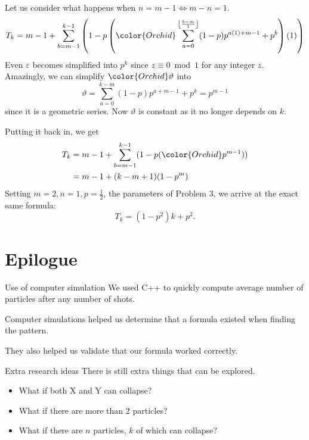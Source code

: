 \documentclass[xcolor={usenames,dvipsnames}]{beamer}
\DeclarePairedDelimiter\floor{\lfloor}{\rfloor}
\begin{document}
\begin{frame}
  Let us consider what happens when $n = m-1 \iff m-n = 1$.
  \begin{equation*}
    T_k = m-1+\sum _{b=m-1}^{k-1} \left(1-p \left({\color{Orchid}\sum _{a=0}^{\floor*{\frac{b-m}{1}} } (1-p) p^{a (1)+m-1}+p^{b}}\right) (1)\right)
  \end{equation*}
  Even $\varepsilon$ becomes simplified into $p^{k}$ since $z \equiv 0 \bmod 1$ for any integer  $z$. Amazingly, we can simplify $\color{Orchid} \vartheta$ into  \[
    \vartheta = \sum _{a=0}^{k-m } (1-p) p^{a+m-1}+p^{k} = p^{m-1}
  \] since it is a geometric series. Now $\vartheta$ is constant as it no longer depends on  $k$.
\end{frame}
\begin{frame}
  Putting it back in, we get 
    \begin{align*}
      T_k &= m-1 + \sum_{b=m-1}^{k-1} (1-p({\color{Orchid} p^{m-1}})) \\
          &= m-1 + (k-m+1)(1-p^{m})
    \end{align*}
    Setting $m = 2, n = 1, p = \frac{1}{2}$, the parameters of Problem 3, we arrive at the exact same formula: \[
      T_k = (1 - p^2)k + p^2
    .\] 
\end{frame}

\section{Epilogue}
\begin{frame}{Use of computer simulation}
  We used C++ to quickly compute average number of particles after any number of shots.

  Computer simulations helped us determine that a formula existed when finding the pattern.

  They also helped us validate that our formula worked correctly.
\end{frame}
\begin{frame}{Extra research ideas}
  There is still extra things that can be explored.
  \begin{itemize}
    \item What if both X and Y can collapse?
    \item What if there are more than 2 particles?
    \item What if there are $n$ particles, $k$ of which can collapse?
  \end{itemize}
\end{frame}
\end{document}
